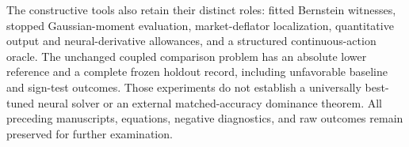 The constructive tools also retain their distinct roles: fitted Bernstein witnesses, stopped Gaussian-moment evaluation, market-deflator localization, quantitative output and neural-derivative allowances, and a structured continuous-action oracle. The unchanged coupled comparison problem has an absolute lower reference and a complete frozen holdout record, including unfavorable baseline and sign-test outcomes. Those experiments do not establish a universally best-tuned neural solver or an external matched-accuracy dominance theorem. All preceding manuscripts, equations, negative diagnostics, and raw outcomes remain preserved for further examination.
